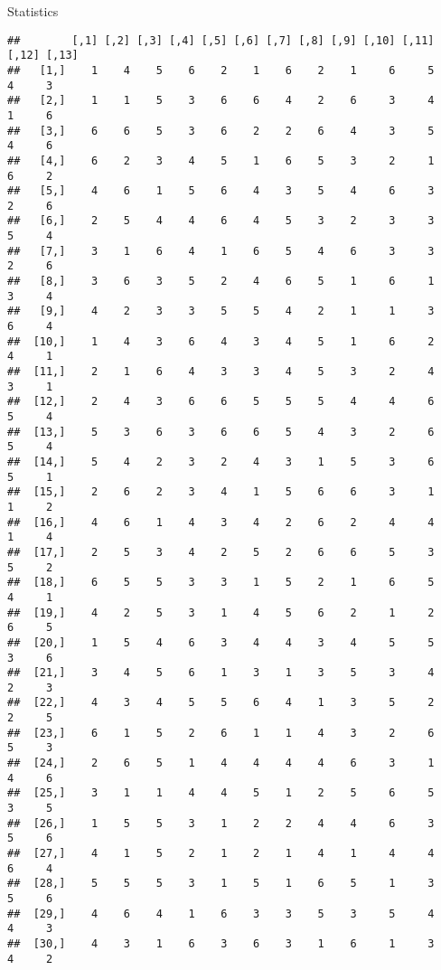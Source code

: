 \documentclass[
  ignorenonframetext,
]{beamer}
\begin{document}
\begin{frame}[fragile]{Statistics}
\protect\hypertarget{statistics}{}
\begin{verbatim}
##        [,1] [,2] [,3] [,4] [,5] [,6] [,7] [,8] [,9] [,10] [,11] [,12] [,13]
##   [1,]    1    4    5    6    2    1    6    2    1     6     5     4     3
##   [2,]    1    1    5    3    6    6    4    2    6     3     4     1     6
##   [3,]    6    6    5    3    6    2    2    6    4     3     5     4     6
##   [4,]    6    2    3    4    5    1    6    5    3     2     1     6     2
##   [5,]    4    6    1    5    6    4    3    5    4     6     3     2     6
##   [6,]    2    5    4    4    6    4    5    3    2     3     3     5     4
##   [7,]    3    1    6    4    1    6    5    4    6     3     3     2     6
##   [8,]    3    6    3    5    2    4    6    5    1     6     1     3     4
##   [9,]    4    2    3    3    5    5    4    2    1     1     3     6     4
##  [10,]    1    4    3    6    4    3    4    5    1     6     2     4     1
##  [11,]    2    1    6    4    3    3    4    5    3     2     4     3     1
##  [12,]    2    4    3    6    6    5    5    5    4     4     6     5     4
##  [13,]    5    3    6    3    6    6    5    4    3     2     6     5     4
##  [14,]    5    4    2    3    2    4    3    1    5     3     6     5     1
##  [15,]    2    6    2    3    4    1    5    6    6     3     1     1     2
##  [16,]    4    6    1    4    3    4    2    6    2     4     4     1     4
##  [17,]    2    5    3    4    2    5    2    6    6     5     3     5     2
##  [18,]    6    5    5    3    3    1    5    2    1     6     5     4     1
##  [19,]    4    2    5    3    1    4    5    6    2     1     2     6     5
##  [20,]    1    5    4    6    3    4    4    3    4     5     5     3     6
##  [21,]    3    4    5    6    1    3    1    3    5     3     4     2     3
##  [22,]    4    3    4    5    5    6    4    1    3     5     2     2     5
##  [23,]    6    1    5    2    6    1    1    4    3     2     6     5     3
##  [24,]    2    6    5    1    4    4    4    4    6     3     1     4     6
##  [25,]    3    1    1    4    4    5    1    2    5     6     5     3     5
##  [26,]    1    5    5    3    1    2    2    4    4     6     3     5     6
##  [27,]    4    1    5    2    1    2    1    4    1     4     4     6     4
##  [28,]    5    5    5    3    1    5    1    6    5     1     3     5     6
##  [29,]    4    6    4    1    6    3    3    5    3     5     4     4     3
##  [30,]    4    3    1    6    3    6    3    1    6     1     3     4     2

\end{verbatim}
\end{frame}
\end{document}
